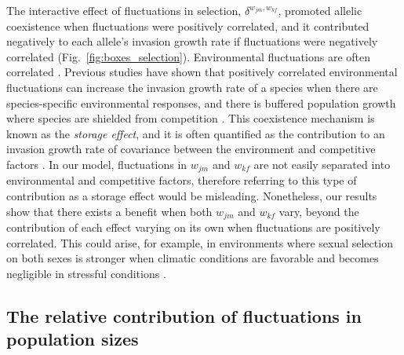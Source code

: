 \documentclass[12pt]{article}
\begin{document}
 The interactive effect of fluctuations in selection, $\delta^{w_{jm},w_{kf}}$, promoted allelic coexistence when fluctuations were positively correlated, and it contributed negatively to each allele's invasion growth rate if fluctuations were negatively correlated (Fig.~\ref{fig:boxes_selection}). Environmental fluctuations are often correlated \citep{steele1985comparison}. Previous studies have shown that positively correlated environmental fluctuations can increase the invasion growth rate of a species when there are species-specific environmental responses, and there is buffered population growth where species are shielded from competition \citep{schreiber2021positively,chesson2000general}. This coexistence mechanism is known as the \textit{storage effect}, and it is often quantified as the contribution to an invasion growth rate of covariance between the environment and competitive factors \citep{chesson2000general,ellner2016quantify,zepeda2019fluctuation}. In our model, fluctuations in $w_{jm}$ and $w_{kf}$ are not easily separated into environmental and competitive factors, therefore referring to this type of contribution as a storage effect would be misleading. Nonetheless, our results show that there exists a benefit when both $w_{jm}$ and $w_{kf}$ vary, beyond the contribution of each effect varying on its own when fluctuations are positively correlated. This could arise, for example, in environments where sexual selection on both sexes is stronger when climatic conditions are favorable and becomes negligible in stressful conditions \citep{cockburn2008swingin}.




 \subsection*{The relative contribution of fluctuations in population sizes}
\end{document}
